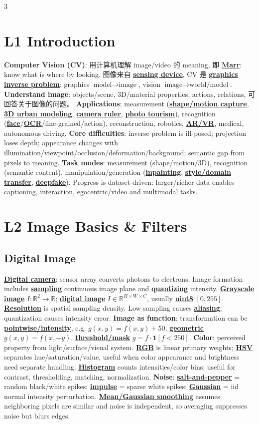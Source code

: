 \documentclass{article}
\numberwithin{equation}{subsection}
\newcommand{\key}[1]{\textbf{#1}}
\newcommand{\lowterm}[1]{\textbf{\underline{#1}}}
\newcommand{\R}{\mathbb{R}}
\begin{document}
\tiny
\begin{multicols*}{3}

\section{L1 Introduction}
\key{Computer Vision (CV)}: 用计算机理解 image/video 的 meaning, 即 \lowterm{Marr}: know what is where by looking. 图像来自 \lowterm{sensing device}, CV 是 \lowterm{graphics inverse problem}: graphics $\text{model}\to\text{image}$, vision $\text{image}\to\text{world/model}$. \key{Understand image}: objects/scene, 3D/material properties, actions, relations, 可回答关于图像的问题。
\key{Applications}: measurement (\lowterm{shape/motion capture}, \lowterm{3D urban modeling}, \lowterm{camera ruler}, \lowterm{photo tourism}), recognition (\lowterm{face}/\lowterm{OCR}/fine-grained/action), reconstruction, robotics, \lowterm{AR/VR}, medical, autonomous driving. \key{Core difficulties}: inverse problem is ill-posed; projection loses depth; appearance changes with illumination/viewpoint/occlusion/deformation/background; semantic gap from pixels to meaning.
\key{Task modes}: measurement (shape/motion/3D), recognition (semantic content), manipulation/generation (\lowterm{inpainting}, \lowterm{style/domain transfer}, \lowterm{deepfake}). Progress is dataset-driven: larger/richer data enables captioning, interaction, egocentric/video and multimodal tasks.

\section{L2 Image Basics \& Filters}
\subsection{Digital Image}
\lowterm{Digital camera}: sensor array converts photons to electrons. Image formation includes \lowterm{sampling} continuous image plane and \lowterm{quantizing} intensity. \lowterm{Grayscale image} $I:\R^2\to\R$; \lowterm{digital image} $I\in\R^{H\times W\times C}$, usually \lowterm{uint8} $[0,255]$. \lowterm{Resolution} is spatial sampling density. Low sampling causes \lowterm{aliasing}; quantization causes intensity error.
\key{Image as function}: transformation can be \lowterm{pointwise/intensity}, e.g. $g(x,y)=f(x,y)+50$, \lowterm{geometric} $g(x,y)=f(x,-y)$, \lowterm{threshold/mask} $g=f\cdot\mathbf 1[f<250]$.
\key{Color}: perceived property from light/surface/visual system. \lowterm{RGB} is linear primary weights; \lowterm{HSV} separates hue/saturation/value, useful when color appearance and brightness need separate handling. \lowterm{Histogram} counts intensities/color bins; useful for contrast, thresholding, matching, normalization.
\key{Noise}: \lowterm{salt-and-pepper} = random black/white spikes; \lowterm{impulse} = sparse white spikes; \lowterm{Gaussian} = iid normal intensity perturbation. \lowterm{Mean/Gaussian smoothing} assumes neighboring pixels are similar and noise is independent, so averaging suppresses noise but blurs edges.


\end{multicols*}
\end{document}
